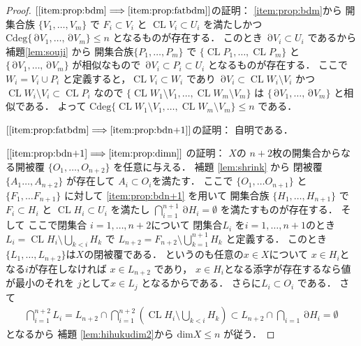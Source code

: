 \documentclass[leqno, a4paper, 12pt]{jsarticle}
\newcommand{\To}{\Longrightarrow}
\DeclareMathOperator{\bd}{\partial}
\DeclareMathOperator{\cl}{CL}
\newcommand{\yodim}{\mathrm{dim}}
\newcommand{\yodeg}{\mathrm{Cdeg}}
\numberwithin{equation}{section}
\begin{document}
\begin{proof}
$[\ref{item:prop:bdm}\To \ref{item:prop:fatbdm}]$の証明：
\ref{item:prop:bdm}から
開集合族
$\{V_{1}, \dots, V_{m}\}$
で
$F_{i}\subset V_{i}$
と
$\cl V_{i}\subset U_{i}$
を満たしかつ
$\yodeg\{\bd V_{1}, \dots, \bd V_{m}\}\le n$
となるものが存在する．
このとき
$\bd V_{i}\subset U_{i}$
であるから
補題\ref{lem:souji}
から
開集合族$\{P_{1}, \dots, P_{m}\}$
で
$\{\cl P_{1}, \dots, \cl P_{m}\}$
と
$\{\bd V_{1}, \dots, \bd V_{m}\}$
が相似なもので
$\bd V_{i}\subset P_{i}\subset U_{i}$
となるものが存在する．
ここで
$W_{i}=V_{i}\cup P_{i}$
と定義すると，$\cl V_{i}\subset W_{i}$
であり
$\bd V_{i} \subset \cl W_{i}\setminus V_{i}$
かつ
$\cl W_{i}\setminus V_{i}\subset \cl P_{i}$
なので
$\{\cl W_{1}\setminus V_{1}, \dots, \cl W_{m}\setminus V_{m}\}$
は
$\{\bd V_{1}, \dots, \bd V_{m}\}$
と相似である．
よって
$\yodeg \{\cl W_{1}\setminus V_{1}, \dots, \cl W_{m}\setminus V_{m}\}\le n$
である．


$[\ref{item:prop:fatbdm}\To \ref{item:prop:bdn+1}]$の証明：
自明である．

$[\ref{item:prop:bdn+1} \To \ref{item:prop:dimn}]$
の証明：
$X$の
$n+2$枚の開集合からなる開被覆
$\{O_{1}, \dots, O_{n+2}\}$
を任意に与える．
補題
\ref{lem:shrink}
から
閉被覆$\{A_{1}\dots, A_{n+2}\}$
が存在して
$A_{i}\subset O_{i}$を満たす．
ここで
$\{O_{1}, \dots O_{n+1}\}$
と
$\{F_{1}, \dots F_{n+1}\}$
に対して
\ref{item:prop:bdn+1}
を用いて
開集合族
$\{H_{1}, \dots, H_{n+1}\}$
で
$F_{i}\subset H_{i}$
と
$\cl H_{i}\subset U_{i}$
を満たし
$\bigcap_{i=1}^{n+1}\bd H_{i}=\emptyset$
を満たすものが存在する．
そして
ここで閉集合
$i=1, \dots, n+2$について
閉集合$L_{i}$
を$i=1, \dots, n+1$のとき
$L_{i}=\cl H_{i}\setminus \bigcup_{k<i} H_{k}$
で
$L_{n+2}=F_{n+2}\setminus \bigcup_{k=1}^{n+1}H_{k}$
と定義する．
このとき$\{L_{1}, \dots, L_{n+2}\}$は$X$の閉被覆である．
というのも任意の$x\in X$について
$x\in H_{i}$となる$i$が存在しなければ
$x\in L_{n+2}$
であり，
$x\in H_{i}$となる添字が存在するなら値が最小のそれを
$j$として$x\in L_{j}$
となるからである．
さらに$L_{i}\subset O_{i}$
である．
さて
\begin{align}
\bigcap_{i=1}^{n+2}L_{i}
=L_{n+2}\cap \bigcap_{i=1}^{n+2}\left(\cl H_{i}\setminus \bigcup_{k<i} H_{k}\right)
\subset L_{n+2}\cap \bigcap_{i=1}\bd H_{i}=\emptyset
\end{align}
となるから
補題
\ref{lem:hihukudim2}から
$\yodim X\le n$
が従う．
\end{proof}
\end{document}

